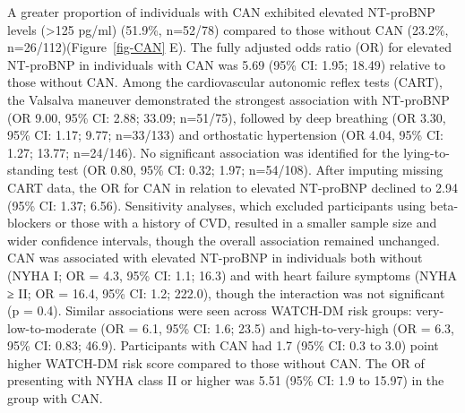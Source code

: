 \documentclass[
  a4paper,
  headsepline=true,
  open=any]{scrbook}
\begin{document}
A greater proportion of individuals with CAN exhibited elevated
NT-proBNP levels (\textgreater125 pg/ml) (51.9\%, n=52/78) compared to
those without CAN (23.2\%, n=26/112)(Figure~\ref{fig-CAN} E). The fully
adjusted odds ratio (OR) for elevated NT-proBNP in individuals with CAN
was 5.69 (95\% CI: 1.95; 18.49) relative to those without CAN. Among the
cardiovascular autonomic reflex tests (CART), the Valsalva maneuver
demonstrated the strongest association with NT-proBNP (OR 9.00, 95\% CI:
2.88; 33.09; n=51/75), followed by deep breathing (OR 3.30, 95\% CI:
1.17; 9.77; n=33/133) and orthostatic hypertension (OR 4.04, 95\% CI:
1.27; 13.77; n=24/146). No significant association was identified for
the lying-to-standing test (OR 0.80, 95\% CI: 0.32; 1.97; n=54/108).
After imputing missing CART data, the OR for CAN in relation to elevated
NT-proBNP declined to 2.94 (95\% CI: 1.37; 6.56). Sensitivity analyses,
which excluded participants using beta-blockers or those with a history
of CVD, resulted in a smaller sample size and wider confidence
intervals, though the overall association remained unchanged. CAN was
associated with elevated NT-proBNP in individuals both without (NYHA I;
OR = 4.3, 95\% CI: 1.1; 16.3) and with heart failure symptoms (NYHA ≥
II; OR = 16.4, 95\% CI: 1.2; 222.0), though the interaction was not
significant (p = 0.4). Similar associations were seen across WATCH-DM
risk groups: very-low-to-moderate (OR = 6.1, 95\% CI: 1.6; 23.5) and
high-to-very-high (OR = 6.3, 95\% CI: 0.83; 46.9). Participants with CAN
had 1.7 (95\% CI: 0.3 to 3.0) point higher WATCH-DM risk score compared
to those without CAN. The OR of presenting with NYHA class II or higher
was 5.51 (95\% CI: 1.9 to 15.97) in the group with CAN.
\end{document}
